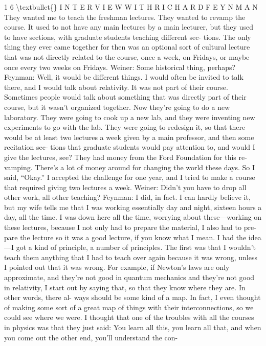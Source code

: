 \documentclass[10pt,oneside]{article}
\begin{document}
1 6 \textbackslash{}textbullet\{\} I N T E R V I E W  W I T H  R I C H A R D  F E Y N M A N They wanted me to teach the freshman lectures. They wanted to revamp the course. It used to not have any main lectures by a main lecturer, but they used to have sections, with graduate students teaching different sec- tions. The only thing they ever came together for then was an optional sort of cultural lecture that was not directly related to the course, once a week, on Fridays, or maybe once every two weeks on Fridays. Weiner: Some historical thing, perhaps? Feynman: Well, it would be different things. I would often be invited to talk there, and I would talk about relativity. It was not part of their course. Sometimes people would talk about something that was directly part of their course, but it wasn’t organized together. Now they’re going to do a new laboratory. They were going to cook up a new lab, and they were inventing new experiments to go with the lab. They were going to redesign it, so that there would be at least two lectures a week given by a main professor, and then some recitation sec- tions that graduate students would pay attention to, and would I give the lectures, see? They had money from the Ford Foundation for this re- vamping. There’s a lot of money around for changing the world these days. So I said, “Okay.” I accepted the challenge for one year, and I tried to make a course that required giving two lectures a week. Weiner: Didn’t you have to drop all other work, all other teaching? Feynman: I did, in fact. I can hardly believe it, but my wife tells me that I was working essentially day and night, sixteen hours a day, all the time. I was down here all the time, worrying about these---working on these lectures, because I not only had to prepare the material, I also had to pre- pare the lecture so it was a good lecture, if you know what I mean. I had the idea---I got a kind of principle, a number of principles. The first was that I wouldn’t teach them anything that I had to teach over again because it was wrong, unless I pointed out that it was wrong. For example, if Newton’s laws are only approximate, and they’re not good in quantum mechanics and they’re not good in relativity, I start out by saying that, so that they know where they are. In other words, there al- ways should be some kind of a map. In fact, I even thought of making some sort of a great map of things with their interconnections, so we could see where we were. I thought that one of the troubles with all the courses in physics was that they just said: You learn all this, you learn all that, and when you come out the other end, you’ll understand the con-\par
\end{document}
